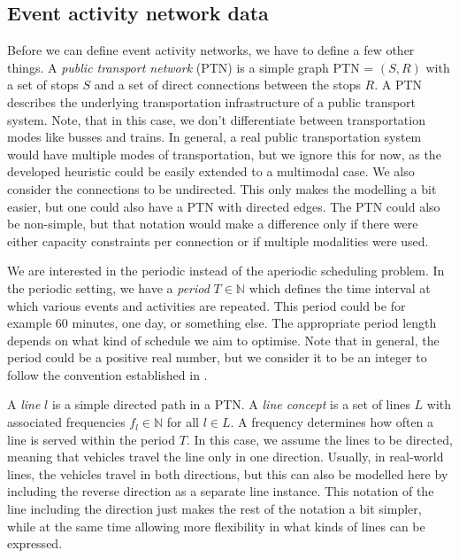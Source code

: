 \documentclass[english, 12pt, a4paper, sci, utf8, a-2b, online]{aaltothesis}
\newtheorem{definition}{Definition}
\newcommand{\N}{\mathbb{N}}
\begin{document}
\subsection{Event activity network data}








Before we can define event activity networks, we have to define a few other things. A \textit{public transport network} (PTN) is a simple graph PTN = $(S, R)$ with a set of stops $S$ and a set of direct connections between the stops $R$. A PTN describes the underlying transportation infrastructure of a public transport system. Note, that in this case, we don't differentiate between transportation modes like busses and trains. In general, a real public transportation system would have multiple modes of transportation, but we ignore this for now, as the developed heuristic could be easily extended to a multimodal case. We also consider the connections to be undirected. This only makes the modelling a bit easier, but one could also have a PTN with directed edges. The PTN could also be non-simple, but that notation would make a difference only if there were either capacity constraints per connection or if multiple modalities were used.

We are interested in the periodic instead of the aperiodic scheduling problem. In the periodic setting, we have a \textit{period} $T \in \N$ which defines the time interval at which various events and activities are repeated. This period could be for example 60 minutes, one day, or something else. The appropriate period length depends on what kind of schedule we aim to optimise. Note that in general, the period could be a positive real number, but we consider it to be an integer to follow the convention established in \cite{schiewe2020periodic}.


A \textit{line} $l$ is a simple directed path in a PTN. A \textit{line concept} is a set of lines $L$ with associated frequencies $f_l \in \N$ for all $l \in L$. A frequency determines how often a line is served within the period $T$. %
In this case, we assume the lines to be directed, meaning that vehicles travel the line only in one direction. Usually, in real-world lines, the vehicles travel in both directions, but this can also be modelled here by including the reverse direction as a separate line instance. This notation of the line including the direction just makes the rest of the notation a bit simpler, while at the same time allowing more flexibility in what kinds of lines can be expressed.
\end{document}
